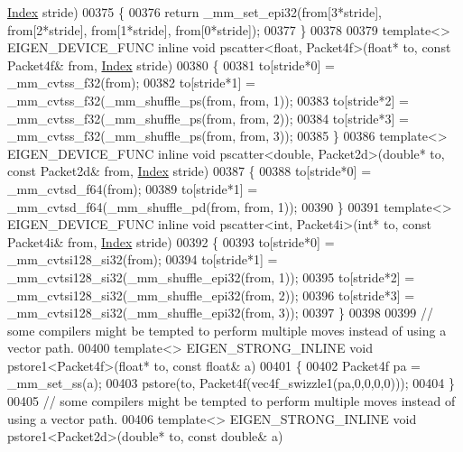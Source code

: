 \begin{DoxyCode}
      \hyperlink{namespace_eigen_a62e77e0933482dafde8fe197d9a2cfde}{Index} stride)
00375 \{
00376  \textcolor{keywordflow}{return} \_mm\_set\_epi32(from[3*stride], from[2*stride], from[1*stride], from[0*stride]);
00377  \}
00378 
00379 \textcolor{keyword}{template}<> EIGEN\_DEVICE\_FUNC \textcolor{keyword}{inline} \textcolor{keywordtype}{void} pscatter<float, Packet4f>(\textcolor{keywordtype}{float}* to, \textcolor{keyword}{const} Packet4f& from, 
      \hyperlink{namespace_eigen_a62e77e0933482dafde8fe197d9a2cfde}{Index} stride)
00380 \{
00381   to[stride*0] = \_mm\_cvtss\_f32(from);
00382   to[stride*1] = \_mm\_cvtss\_f32(\_mm\_shuffle\_ps(from, from, 1));
00383   to[stride*2] = \_mm\_cvtss\_f32(\_mm\_shuffle\_ps(from, from, 2));
00384   to[stride*3] = \_mm\_cvtss\_f32(\_mm\_shuffle\_ps(from, from, 3));
00385 \}
00386 \textcolor{keyword}{template}<> EIGEN\_DEVICE\_FUNC \textcolor{keyword}{inline} \textcolor{keywordtype}{void} pscatter<double, Packet2d>(\textcolor{keywordtype}{double}* to, \textcolor{keyword}{const} Packet2d& from, 
      \hyperlink{namespace_eigen_a62e77e0933482dafde8fe197d9a2cfde}{Index} stride)
00387 \{
00388   to[stride*0] = \_mm\_cvtsd\_f64(from);
00389   to[stride*1] = \_mm\_cvtsd\_f64(\_mm\_shuffle\_pd(from, from, 1));
00390 \}
00391 \textcolor{keyword}{template}<> EIGEN\_DEVICE\_FUNC \textcolor{keyword}{inline} \textcolor{keywordtype}{void} pscatter<int, Packet4i>(\textcolor{keywordtype}{int}* to, \textcolor{keyword}{const} Packet4i& from, 
      \hyperlink{namespace_eigen_a62e77e0933482dafde8fe197d9a2cfde}{Index} stride)
00392 \{
00393   to[stride*0] = \_mm\_cvtsi128\_si32(from);
00394   to[stride*1] = \_mm\_cvtsi128\_si32(\_mm\_shuffle\_epi32(from, 1));
00395   to[stride*2] = \_mm\_cvtsi128\_si32(\_mm\_shuffle\_epi32(from, 2));
00396   to[stride*3] = \_mm\_cvtsi128\_si32(\_mm\_shuffle\_epi32(from, 3));
00397 \}
00398 
00399 \textcolor{comment}{// some compilers might be tempted to perform multiple moves instead of using a vector path.}
00400 \textcolor{keyword}{template}<> EIGEN\_STRONG\_INLINE \textcolor{keywordtype}{void} pstore1<Packet4f>(\textcolor{keywordtype}{float}* to, \textcolor{keyword}{const} \textcolor{keywordtype}{float}& a)
00401 \{
00402   Packet4f pa = \_mm\_set\_ss(a);
00403   pstore(to, Packet4f(vec4f\_swizzle1(pa,0,0,0,0)));
00404 \}
00405 \textcolor{comment}{// some compilers might be tempted to perform multiple moves instead of using a vector path.}
00406 \textcolor{keyword}{template}<> EIGEN\_STRONG\_INLINE \textcolor{keywordtype}{void} pstore1<Packet2d>(\textcolor{keywordtype}{double}* to, \textcolor{keyword}{const} \textcolor{keywordtype}{double}& a)

\end{DoxyCode}
